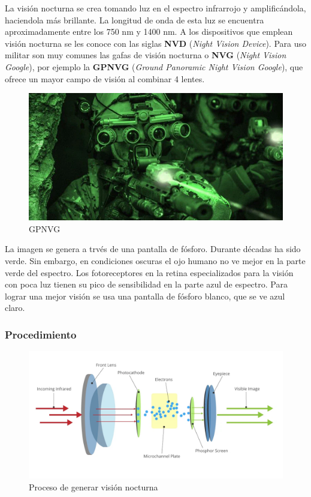 La visión nocturna se crea tomando luz en el espectro infrarrojo y amplificándola, haciendola más brillante. La longitud de onda de esta luz se encuentra aproximadamente entre los 750 nm y 1400 nm. A los dispositivos que emplean visión nocturna se les conoce con las siglas \textbf{NVD} (\textit{Night Vision Device}). Para uso militar son muy comunes las gafas de visión nocturna o \textbf{NVG} (\textit{Night Vision Google}), por ejemplo la \textbf{GPNVG} (\textit{Ground Panoramic Night Vision Google}), que ofrece un mayor campo de visión al combinar 4 lentes.

\begin{figure}[H]
  \centering
  \includegraphics[scale=0.4]{imagenes/nvg.png}
  \caption{GPNVG\cite{tactgearnv}}
\end{figure}

La imagen se genera a trvés de una pantalla de fósforo. Durante décadas ha sido verde. Sin embargo, en condiciones oscuras el ojo humano no ve mejor en la parte verde del espectro. Los fotoreceptores en la retina especializados para la visión con poca luz tienen su pico de sensibilidad en la parte azul de espectro. Para lograr una mejor visión se usa una pantalla de fósforo blanco, que se ve azul claro.

\subsubsection{Procedimiento}

\begin{figure}[H]
  \centering
  \includegraphics[scale=0.4]{imagenes/vision_nocturna.png}
  \caption{Proceso de generar visión nocturna\cite{jpnvnv}}
\end{figure}

